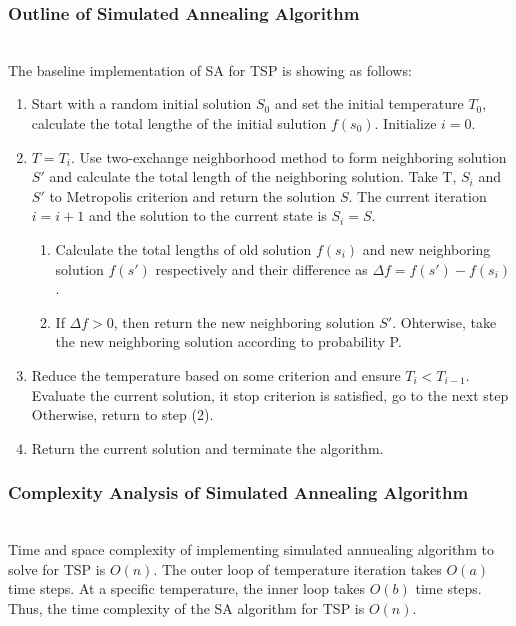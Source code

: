 \subsubsection{Outline of Simulated Annealing Algorithm}
\hfill\\
The baseline implementation of SA for TSP is showing as follows:
\begin{enumerate}
\item Start with a random initial solution \(S_0\) and set the initial temperature \(T_0\), calculate the total lengthe of the initial sulution \(f(s_0)\). Initialize \(i=0\).
\item \(T = T_i\). Use two-exchange neighborhood method to form neighboring solution \(S'\) and calculate the total length of the neighboring solution. Take T, \(S_i\) and \(S'\) to Metropolis criterion and return the solution \(S\). The current iteration \(i=i+1\) and the solution to the current state is \(S_i=S\).
\begin{enumerate}
\item Calculate the total lengths of old solution \(f(s_i)\) and new neighboring solution \(f(s')\) respectively and their difference as \(\Delta f=f(s')-f(s_i) \).
\item If \(\Delta f>0\), then return the new neighboring solution \(S'\). Ohterwise, take the new neighboring solution according to probability P.
\end{enumerate}
\item Reduce the temperature based on some criterion and ensure \(T_i<T_{i-1}\). Evaluate the current solution, it stop criterion is satisfied, go to the next step Otherwise, return to step (2).
\item Return the current solution and terminate the algorithm.
\end{enumerate}


\subsubsection{Complexity Analysis of Simulated Annealing Algorithm}
\hfill\\
Time and space complexity of implementing simulated annuealing algorithm to solve for TSP is \(O(n)\). 
The outer loop of temperature iteration takes \(O(a)\) time steps. At a specific temperature, the inner loop takes \(O(b)\) time steps. Thus, the time complexity of the SA algorithm for TSP is \(O(n)\).

